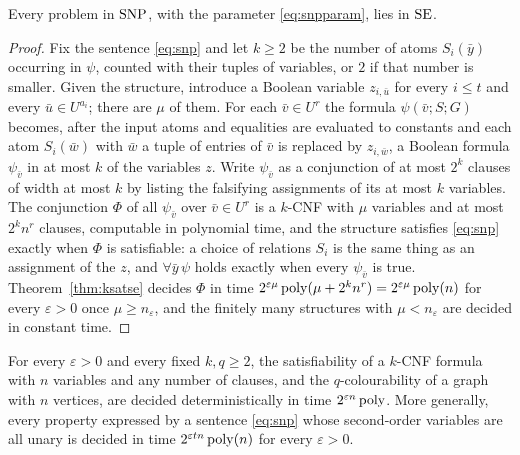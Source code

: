 \begin{theorem}[$\SNP\subseteq\SE$]\label{thm:snp}
Every problem in $\operatorname{SNP}$, with the parameter \eqref{eq:snpparam}, lies in $\operatorname{SE}$.
\end{theorem}

\begin{proof}
Fix the sentence \eqref{eq:snp} and let $k\ge 2$ be the number of atoms
$S_i(\bar y)$ occurring in $\psi$, counted with their tuples of variables, or
$2$ if that number is smaller. Given
the structure, introduce a Boolean variable $z_{i,\bar u}$ for every $i\le t$
and every $\bar u\in U^{a_i}$; there are $\mu$ of them. For each
$\bar v\in U^{r}$ the formula $\psi(\bar v;S;G)$ becomes, after the input atoms
and equalities are evaluated to constants and each atom $S_i(\bar w)$ with
$\bar w$ a tuple of entries of $\bar v$ is replaced by $z_{i,\bar w}$, a Boolean
formula $\psi_{\bar v}$ in at most $k$ of the variables $z$. Write
$\psi_{\bar v}$ as a conjunction of at most $2^{k}$ clauses of width at most $k$
by listing the falsifying assignments of its at most $k$ variables. The
conjunction $\Phi$ of all $\psi_{\bar v}$ over $\bar v\in U^r$ is a $k$-CNF with
$\mu$ variables and at most $2^kn^r$ clauses, computable in polynomial time,
and the structure satisfies \eqref{eq:snp} exactly when $\Phi$ is satisfiable:
a choice of relations $S_i$ is the same thing as an assignment of the $z$, and
$\forall\bar y\,\psi$ holds exactly when every $\psi_{\bar v}$ is true.
Theorem~\ref{thm:ksatse} decides $\Phi$ in time
$2^{\varepsilon\mu}\operatorname{poly}(\mu+2^kn^r)=2^{\varepsilon\mu}\operatorname{poly}(n)$ for every
$\varepsilon>0$ once $\mu\ge n_\varepsilon$, and the finitely many structures
with $\mu<n_\varepsilon$ are decided in constant time.
\end{proof}

\begin{corollary}\label{cor:snpexamples}
For every $\varepsilon>0$ and every fixed $k,q\ge 2$, the satisfiability of a
$k$-CNF formula with $n$ variables and any number of clauses, and the
$q$-colourability of a graph with $n$ vertices, are decided deterministically in
time $2^{\varepsilon n}\operatorname{poly}$. More generally, every property expressed by a
sentence \eqref{eq:snp} whose second-order variables are all unary is decided in
time $2^{\varepsilon tn}\operatorname{poly}(n)$ for every $\varepsilon>0$.
\end{corollary}

